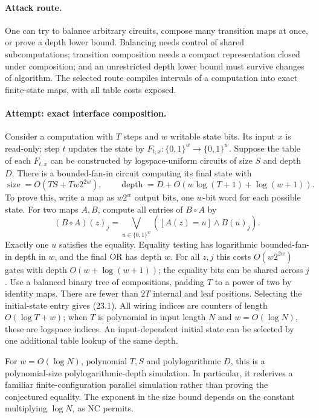 \documentclass[11pt,a4paper]{article}
\begin{document}
\paragraph{Attack route.}
One can try to balance arbitrary circuits, compose many transition maps
at once, or prove a depth lower bound. Balancing needs control of shared
subcomputations; transition composition needs a compact representation
closed under composition; and an unrestricted depth lower bound must
survive changes of algorithm. The selected route compiles intervals of a
computation into exact finite-state maps, with all table costs exposed.

\paragraph{Attempt: exact interface composition.}
Consider a computation with $T$ steps and $w$ writable state bits. Its
input $x$ is read-only; step $t$ updates the state by
$F_{t,x}:\{0,1\}^w\to\{0,1\}^w$. Suppose the table of each $F_{t,x}$
can be constructed by logspace-uniform circuits of size $S$ and depth $D$.
There is a bounded-fan-in circuit computing its final state with
\[
 \operatorname{size}=O(TS+T w2^{2w}),\qquad
 \operatorname{depth}=D+O(w\log(T+1)+\log(w+1)).
 \tag{23.1}
\]
To prove this, write a map as $w2^w$ output bits, one $w$-bit word for each
possible state. For two maps $A,B$, compute all entries of $B\circ A$ by
\[
 (B\circ A)(z)_j=
 \bigvee_{u\in\{0,1\}^w}
       \left([A(z)=u]\wedge B(u)_j\right).
 \tag{23.2}
\]
Exactly one $u$ satisfies the equality. Equality testing has logarithmic
bounded-fan-in depth in $w$, and the final OR has depth $w$. For all $z,j$
this costs $O(w2^{2w})$ gates with depth $O(w+\log(w+1))$; the equality
bits can be shared across $j$. Use a balanced binary tree of compositions,
padding $T$ to a power of two by identity maps. There are fewer than $2T$
internal and leaf positions. Selecting the initial-state entry gives
(23.1). All wiring indices are counters of length
$O(\log T+w)$; when $T$ is polynomial in input length $N$ and
$w=O(\log N)$, these are logspace indices. An input-dependent initial
state can be selected by one additional table lookup of the same depth.

For $w=O(\log N)$, polynomial $T,S$ and polylogarithmic $D$, this is a
polynomial-size polylogarithmic-depth simulation. In particular, it
rederives a familiar finite-configuration parallel simulation rather than
proving the conjectured equality. The exponent in the size bound depends
on the constant multiplying $\log N$, as NC permits.
\end{document}
